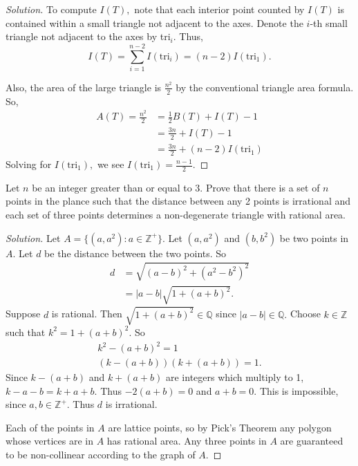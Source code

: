 \documentclass[12pt]{article}
\newcommand{\Z}{\mathbb{Z}}
\newcommand{\Q}{\mathbb{Q}}
\newenvironment{exercise}[2][Exercise]{\begin{trivlist}
        \item[\hskip \labelsep {\bfseries #1}\hskip \labelsep {\bfseries #2.}]}{\end{trivlist}}
\newenvironment{solution}
        {\begin{proof}[Solution]}
                    {\end{proof}}
\begin{document}
\begin{exercise}{76}
\begin{solution}
        To compute \( I(T) , \) note that each interior point counted by \( I(T) \) is contained within a small triangle not adjacent to the axes. Denote the \( i \)-th small triangle not adjacent to the axes by tri\(_{i} . \) Thus, \[ I(T) = \sum_{i=1}^{n-2} I(\text{tri}_{i}) = (n-2) I(\text{tri}_{1} ) . \]

        Also, the area of the large triangle is \( \frac{n^{2}}{2} \) by the conventional triangle area formula. So,
        \begin{align*}
            A(T) = \frac{n^{2}}{2} &= \frac{1}{2} B(T) + I(T) -1 \\
            &= \frac{3 n}{2} + I(T) -1\\
            &= \frac{3n}{2} + (n-2) I(\text{tri}_{1})
        \end{align*}
        Solving for \( I(\text{tri}_{1}) , \) we see $I(\text{tri}_{1}) = \frac{n-1}{2}$.
    \end{solution}
\end{exercise}

\begin{exercise}{77}
    Let \( n \) be an integer greater than or equal to 3. Prove that there is a set of \( n \) points in the plance such that the distance between any 2 points is irrational and each set of three points determines a non-degenerate triangle with rational area.
    \begin{solution}
        Let \( A = \{(a, a^{2}) : a \in \Z^{+} \} . \) Let \( (a, a^{2}) \) and \( (b,b^{2}) \) be two points in \( A. \) Let \( d \) be the distance between the two points. So
        \begin{align*}
            d &= \sqrt{(a-b)^{2} + (a^{2} - b^{2})^{2}} \\
            &= \left|a - b\right| \sqrt{1 + (a + b)^{2} } .
        \end{align*}
        Suppose \( d \) is rational. Then \( \sqrt{1 + (a + b)^{2}} \in \Q \) since \( \left|a-b\right| \in \Q. \) Choose \( k \in \Z \) such that \( k^{2} = 1 + (a +b)^{2} . \) So
        \begin{align*}
            k^{2} - (a + b)^{2} = 1\\
            (k - (a + b)) (k + (a + b)) = 1.
        \end{align*}
        Since \( k- (a +b) \) and \( k + (a + b) \) are integers which multiply to 1, \( k - a - b = k + a + b .\) Thus \( -2 (a + b) = 0 \) and \( a + b = 0. \) This is impossible, since \( a,b \in \Z^{+} . \) Thus \( d \) is irrational.

        Each of the points in \( A \) are lattice points, so by Pick's Theorem any polygon whose vertices are in \( A \) has rational area. Any three points in \( A \) are guaranteed to be non-collinear according to the graph of \( A. \)
    \end{solution}
\end{exercise}
\end{document}

